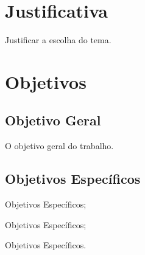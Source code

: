 \section{Justificativa}
Justificar a escolha do tema.



\section{Objetivos}
\subsection{Objetivo Geral}
O objetivo geral do trabalho.



\subsection{Objetivos Específicos}
\begin{lista}
  \item Objetivos Específicos;
  \item Objetivos Específicos;
  \item Objetivos Específicos.
\end{lista}

